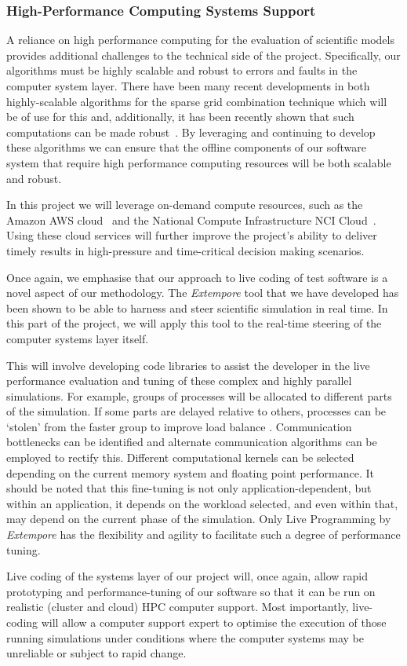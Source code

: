\subsubsection*{High-Performance Computing Systems Support}

A reliance on high performance computing for the evaluation of
scientific models provides additional challenges to the technical side
of the project. Specifically, our algorithms must be highly scalable
and robust to errors and faults in the computer system layer. There
have been many recent developments in both highly-scalable algorithms
for the sparse grid combination
technique \cite{sgctalg15,pdsec15extsgctalg} which will be of use for
this and, additionally, it has been recently shown that such
computations can be made
robust~\parencite{HardingHLS2015,AliEtal2015,Ali11022016}. By
leveraging and continuing to develop these algorithms we can ensure
that the offline components of our software system that require high
performance computing resources will be both scalable and robust.

In this project we will leverage on-demand compute resources, such as
the Amazon AWS cloud~\parencite{amazonAws} and the National Compute
Infrastructure NCI Cloud~\parencite{nciCloud}. Using these cloud
services will further improve the project's ability to deliver timely
results in high-pressure and time-critical decision making scenarios.

Once again, we emphasise that our approach to live coding of test
software is a novel aspect of our methodology. The \emph{Extempore}
tool that we have developed has been shown to be able to harness and
steer scientific simulation in real time. In this part of the project,
we will apply this tool to the real-time steering of the computer
systems layer itself.

This will involve developing code libraries to assist the developer in
the live performance evaluation and tuning of these complex and highly
parallel simulations. For example, groups of processes will be
allocated to different parts of the simulation. If some parts are
delayed relative to others, processes can be `stolen' from the faster
group to improve load balance \cite{parSGCT16}. Communication
bottlenecks can be identified and alternate communication algorithms
can be employed to rectify this.  Different computational kernels can
be selected depending on the current memory system and floating point
performance.  It should be noted that this fine-tuning is not only
application-dependent, but within an application, it depends on the
workload selected, and even within that, may depend on the current
phase of the simulation. Only Live Programming by \emph{Extempore} has
the flexibility and agility to facilitate such a degree of performance
tuning.

Live coding of the systems layer of our project will, once again,
allow rapid prototyping and performance-tuning of our software so that
it can be run on realistic (cluster and cloud) HPC computer
support. Most importantly, live-coding will allow a computer support
expert to optimise the execution of those running simulations under
conditions where the computer systems may be unreliable or subject to
rapid change.
